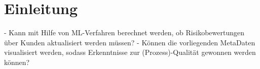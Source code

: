 \chapter{Einleitung}\label{ch:intro}





- Kann mit Hilfe von ML-Verfahren berechnet werden, ob Risikobewertungen über Kunden aktualisiert werden müssen? 
- Können die vorliegenden MetaDaten visualisiert werden, sodass Erkenntnisse zur (Prozess)-Qualität gewonnen werden können? 






